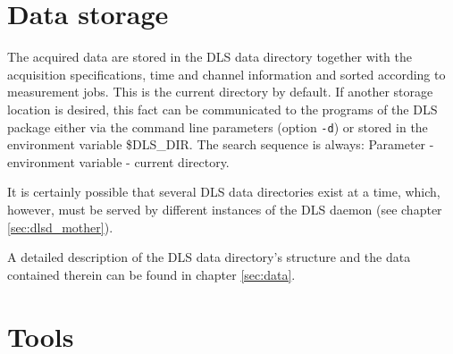 \documentclass[a4paper,12pt,BCOR6mm,bibtotoc,idxtotoc]{scrbook}
\begin{document}

\section{Data storage} \label{sec:allg_ablage}

The acquired data are stored in the DLS data directory together with the acquisition specifications, time and channel information and sorted according to measurement jobs. This is the current directory by default. If another storage location is desired, this fact can be communicated to the programs of the DLS package either via the command line parameters (option \texttt{-d}) or stored in the environment variable \$DLS\_DIR. The search sequence is always: Parameter - environment variable - current directory.

It is certainly possible that several DLS data directories exist at a time, which, however, must be served by different instances of the DLS daemon (see chapter \ref{sec:dlsd_mother}).

A detailed description of the DLS data directory’s structure and the data contained therein can be found in chapter \ref{sec:data}.


\section{Tools} 
\label{sec:allg_tools} 
\end{document}
